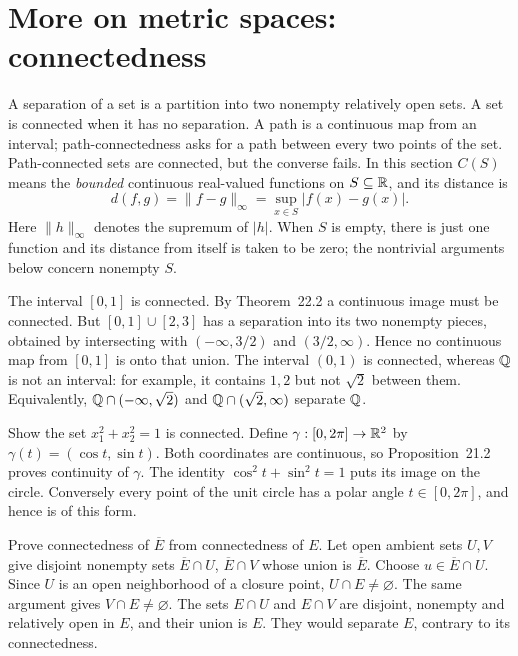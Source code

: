 \section{More on metric spaces: connectedness}
A separation of a set is a partition into two nonempty relatively
open sets. A set is connected when it has no separation. A path is a
continuous map from an interval; path-connectedness asks for a path
between every two points of the set. Path-connected sets are connected,
but the converse fails. In this section $C(S)$ means the
\emph{bounded} continuous real-valued functions on $S\subseteq\mathbb{R}$,
and its distance is
\[
 d(f,g)=\|f-g\|_\infty=\sup_{x\in S}|f(x)-g(x)|.
\]
Here $\|h\|_\infty$ denotes the supremum of $|h|$. When $S$ is empty,
there is just one function and its distance from itself is taken to be
zero; the nontrivial arguments below concern nonempty $S$.

The interval $[0,1]$ is connected. By Theorem~22.2 a continuous image
must be connected. But $[0,1]\cup[2,3]$ has a separation into its two
nonempty pieces, obtained by intersecting with $(-\infty,3/2)$ and
$(3/2,\infty)$. Hence no continuous map from $[0,1]$ is onto that union.
The interval $(0,1)$ is connected, whereas $\mathbb{Q}$ is not an interval:
for example, it contains $1,2$ but not $\sqrt2$ between them. Equivalently,
$\mathbb{Q}\cap(-\infty,\sqrt2)$ and $\mathbb{Q}\cap(\sqrt2,\infty)$ separate $\mathbb{Q}$.

\goal Show the set $x_1^2+x_2^2=1$ is connected.
Define $\gamma:[0,2\pi]\to\mathbb{R}^2$ by
$\gamma(t)=(\cos t,\sin t)$. Both coordinates are continuous, so
Proposition~21.2 proves continuity of $\gamma$. The identity
$\cos^2t+\sin^2t=1$ puts its image on the circle. Conversely every
point of the unit circle has a polar angle $t\in[0,2\pi]$, and hence
is of this form.

\goal Prove connectedness of $\overline E$ from connectedness of $E$.
Let open ambient sets $U,V$ give disjoint nonempty sets
$\overline E\cap U$, $\overline E\cap V$ whose union is $\overline E$.
Choose $u\in\overline E\cap U$. Since $U$ is an open neighborhood
of a closure point, $U\cap E\ne\varnothing$. The same argument gives
$V\cap E\ne\varnothing$.
The sets $E\cap U$ and $E\cap V$ are disjoint, nonempty and relatively
open in $E$, and their union is $E$. They would separate $E$, contrary
to its connectedness.

